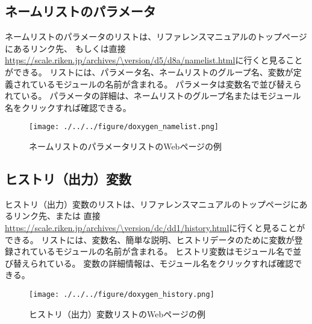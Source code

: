 \subsection{ネームリストのパラメータ}
ネームリストのパラメータのリストは、リファレンスマニュアルのトップページにあるリンク先、
もしくは直接\url{https://scale.riken.jp/archives/\version/d5/d8a/namelist.html}に行くと見ることができる。
リストには、パラメータ名、ネームリストのグループ名、変数が定義されているモジュールの名前が含まれる。
パラメータは変数名で並び替えられている。
パラメータの詳細は、ネームリストのグループ名またはモジュール名をクリックすれば確認できる。

\begin{figure}[h]
\begin{center}
  \texttt{[image: ./../../figure/doxygen\_namelist.png]}\\
  \caption{ネームリストのパラメータリストのWebページの例}
  \label{fig:doxygen_namelist}
\end{center}
\end{figure}

\newpage
\subsection{ヒストリ（出力）変数}
ヒストリ（出力）変数のリストは、リファレンスマニュアルのトップページにあるリンク先、または
直接\url{https://scale.riken.jp/archives/\version/dc/dd1/history.html}に行くと見ることができる。
リストには、変数名、簡単な説明、ヒストリデータのために変数が登録されているモジュールの名前が含まれる。
ヒストリ変数はモジュール名で並び替えられている。
変数の詳細情報は、モジュール名をクリックすれば確認できる。

\begin{figure}[h]
\begin{center}
  \texttt{[image: ./../../figure/doxygen\_history.png]}\\
  \caption{ヒストリ（出力）変数リストのWebページの例}
  \label{fig:doxygen_history}
\end{center}
\end{figure}
